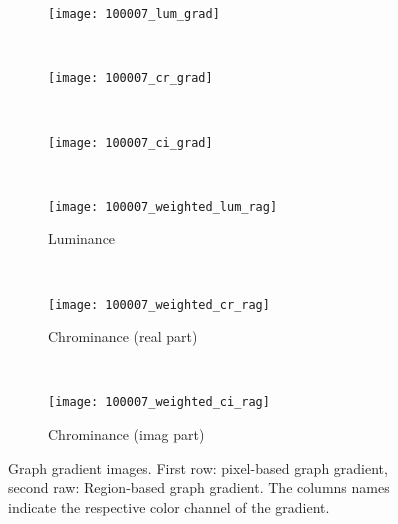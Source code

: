 \begin{figure}[!ht]
    \centering
    \begin{subfigure}[b]{0.3\textwidth}
    	\texttt{[image: 100007\_lum\_grad]} 
    \end{subfigure}      
    ~ %
    \begin{subfigure}[b]{0.3\textwidth}
        \texttt{[image: 100007\_cr\_grad]}
    \end{subfigure}
    ~ %
    \begin{subfigure}[b]{0.3\textwidth}
        \texttt{[image: 100007\_ci\_grad]}
    \end{subfigure} \\ [1ex]    
    \begin{subfigure}[b]{0.3\textwidth}
    	\texttt{[image: 100007\_weighted\_lum\_rag]} 
    	\caption{Luminance}
    \end{subfigure}      
    ~ %
    \begin{subfigure}[b]{0.3\textwidth}
        \texttt{[image: 100007\_weighted\_cr\_rag]}
        \caption{Chrominance (real part)}
    \end{subfigure}
    ~ %
    \begin{subfigure}[b]{0.3\textwidth}
        \texttt{[image: 100007\_weighted\_ci\_rag]}
        \caption{Chrominance (imag part)}
    \end{subfigure}
    
	\caption{Graph gradient images. First row: pixel-based graph gradient, second raw: Region-based graph gradient. The columns names indicate the respective color channel of the gradient.}\label{fig:graph_gradient_pixel_superpixel}    
\end{figure}

